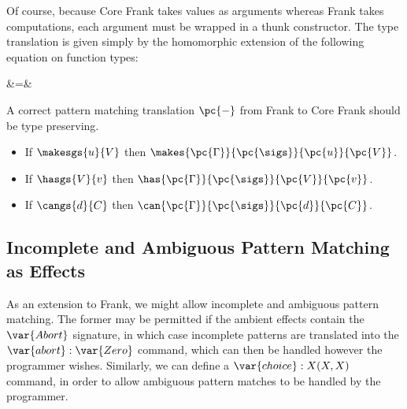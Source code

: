 Of course, because Core Frank takes values as arguments whereas Frank
takes computations, each argument must be wrapped in a thunk
constructor.
%
The type translation is given simply by the homomorphic extension of the
following equation on function types:
\begin{equations}
 \to {} &=&  \to {} \\
\end{equations}

A correct pattern matching translation $\pc{-}$ from Frank to Core
Frank should be type preserving.
\begin{itemize}
\item If $\makesgs{u}{V}$ then $\makes{\pc{\Gamma}}{\pc{\sigs}}{\pc{u}}{\pc{V}}$.
\item If $\hasgs{V}{v}$   then $\has{\pc{\Gamma}}{\pc{\sigs}}{\pc{V}}{\pc{v}}$.
\item If $\cangs{d}{C}$   then $\can{\pc{\Gamma}}{\pc{\sigs}}{\pc{d}}{\pc{C}}$.
\end{itemize}

\subsection{Incomplete and Ambiguous Pattern Matching as Effects}

As an extension to Frank, we might allow incomplete and ambiguous
pattern matching. The former may be permitted if the ambient effects
contain the $\var{Abort}$ signature, in which case incomplete patterns
are translated into the $\var{abort}:\var{Zero}$ command, which can
then be handled however the programmer wishes. Similarly, we can define
a $\var{choice}:X(X, X)$ command, in order to allow ambiguous pattern
matches to be handled by the programmer.


